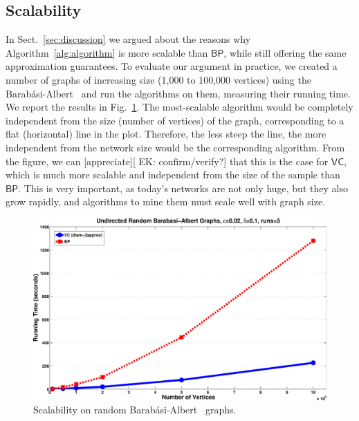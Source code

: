 \subsection{Scalability}\label{sec:scalability}

In Sect.~\ref{sec:discussion} we argued about the reasons why
Algorithm~\ref{alg:algorithm} is more scalable than $\mathsf{BP}$, while still
offering the same approximation guarantees. To evaluate our argument in practice, we
created a number of graphs of increasing size (1,000 to 100,000 vertices) using
the Barab\'asi-Albert~\citep{BarabasiA99} and run the algorithms on them,
measuring their running time. We report the results in Fig.~\ref{fig:random:time}.
The most-scalable algorithm would be completely independent from the size
(number of vertices) of the graph, corresponding to a flat (horizontal) line in
the plot. Therefore, the less steep the line, the more independent from the
network size would be the corresponding algorithm. From the figure, we can
[appreciate][ EK: confirm/verify?] that this is the case for $\mathsf{VC}$, which is much more scalable
and independent from the size of the sample than $\mathsf{BP}$. This is very
important, as today's networks are not only huge, but they also grow rapidly,
and algorithms to mine them must scale well with graph size.
\begin{figure}[ht]
  \centering
  \includegraphics[width=.45\textwidth,keepaspectratio]{figures/eps/random-time}
  \caption{Scalability on random Barab\'asi-Albert~\citep{BarabasiA99} graphs.}
  \label{fig:random:time}
\end{figure}


